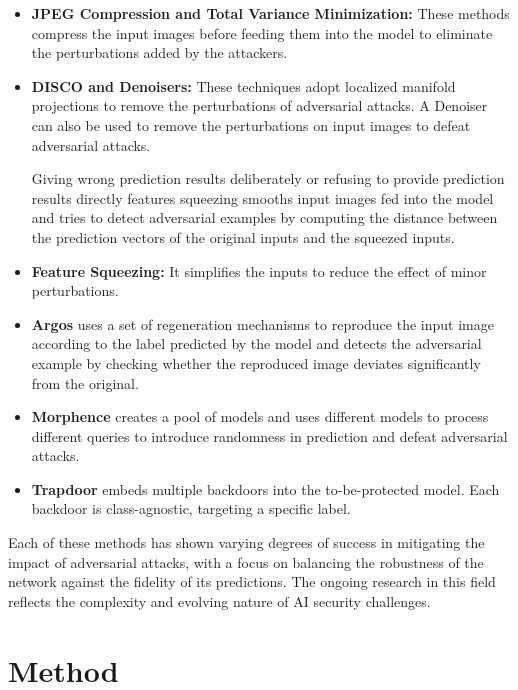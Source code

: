 \documentclass[letterpaper,twocolumn,10pt]{article}
\begin{document}
\begin{itemize}
    \item \textbf{JPEG Compression and Total Variance Minimization:} These methods compress the input images before feeding them into the model to eliminate the perturbations added by the attackers.
    
    \item \textbf{DISCO and Denoisers:} These techniques adopt localized manifold projections to remove the perturbations of adversarial attacks. A Denoiser can also be used to remove the perturbations on input images to defeat adversarial attacks.
    
    Giving wrong prediction results deliberately or refusing to provide prediction results directly features squeezing smooths input images fed into the model and tries to detect adversarial examples by computing the distance between the prediction vectors of the original inputs and the squeezed inputs.
    
    \item \textbf{Feature Squeezing:} It simplifies the inputs to reduce the effect of minor perturbations.
    
    \item \textbf{Argos} uses a set of regeneration mechanisms to reproduce the input image according to the label predicted by the model and detects the adversarial example by checking whether the reproduced image deviates significantly from the original.
    
    \item \textbf{Morphence} creates a pool of models and uses different models to process different queries to introduce randomness in prediction and defeat adversarial attacks.
    
    \item \textbf{Trapdoor} embeds multiple backdoors into the to-be-protected model. Each backdoor is class-agnostic, targeting a specific label.
\end{itemize}
Each of these methods has shown varying degrees of success in mitigating the impact of adversarial attacks, with a focus on balancing the robustness of the network against the fidelity of its predictions. The ongoing research in this field reflects the complexity and evolving nature of AI security challenges.


\section{Method}
\end{document}
